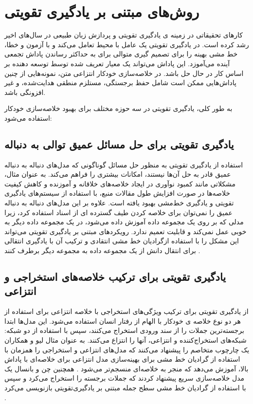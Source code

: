\chapter{روش‌های مبتنی بر یادگیری تقویتی}

کارهای تحقیقاتی در زمینه ی یادگیری تقویتی 
و پردازش زبان طبیعی در سال‌های اخیر رشد کرده است. در یادگیری تقویتی  یک عامل با محیط تعامل می‌کند و با آزمون و خطا، خط مشی بهینه را برای تصمیم گیری متوالی برای به حداکثر رساندن پاداش تجمعی آینده می‌آموزد. این پاداش می‌تواند یک معیار تعریف شده توسط توسعه دهنده بر اساس کار در حال حل باشد. در خلاصه‌سازی خودکار انتزاعی متن، نمونه‌هایی از چنین پاداش‌هایی ممکن است شامل حفظ برجستگی، مستلزم منطقی هدایت‌شده، و غیر افزونگی باشد. 

به طور کلی،  یادگیری تقویتی  در سه حوزه مختلف برای بهبود خلاصه‌سازی خودکار استفاده می‌شود:

\section{یادگیری تقویتی برای حل مسائل عمیق توالی به دنباله}

استفاده از یادگیری تقویتی به منظور حل مسائل گوناگونی که مدل‌های دنباله به دنباله عمیق قادر به حل آن‌ها نیستند، امکانات بیشتری را فراهم می‌کند. به عنوان مثال، مشکلاتی مانند کمبود نوآوری در ایجاد خلاصه‌های خلاقانه و آموزنده و کاهش کیفیت خلاصه‌ها در صورت افزایش طول مقالات منبع، با استفاده از سیستم‌های یادگیری تقویتی و یادگیری خط‌مشی		 بهبود یافته است.
 علاوه بر این  مدل‌های دنباله به دنباله عمیق را نمی‌توان برای خلاصه کردن طیف گسترده ای از اسناد استفاده کرد، زیرا مدلی که بر روی یک مجموعه داده آموزش داده می‌شود، در یک مجموعه داده دیگر به خوبی عمل نمی‌کند و قابلیت تعمیم ندارد. رویکردهای مبتنی بر یادگیری تقویتی می‌تواند این  مشکل را با استفاده ازگرادیان خط مشی انتقادی
  و ترکیب آن با یادگیری انتقالی
برای انتقال دانش از یک مجموعه داده به مجموعه دیگر برطرف کنند
\cite{DeepTL_RL}.


\section{یادگیری تقویتی برای ترکیب خلاصه‌های استخراجی و انتزاعی} 
  از یادگیری تقویتی برای ترکیب ویژگی‌های استخراجی با خلاصه انتزاعی برای استفاده از هر دو نوع خلاصه ی خودکار با الهام از رفتار انسان استفاده می‌شود. این مدل‌ها ابتدا برجسته‌ترین جملات را از سند ورودی استخراج می‌کنند، سپس با استفاده از دو شبکه: شبکه‌های استخراج‌کننده و انتزاعی، آنها را انتزاع می‌کنند. به عنوان مثال لیو و همکاران یک چارچوب متخاصم را پیشنهاد می‌کنند که مدل‌های انتزاعی و استخراجی را همزمان با استفاده از گرادیان خط ‌مشی برای بهینه‌سازی مدل انتزاعی برای خلاصه‌ای با پاداش بالا، آموزش می‌دهد که منجر به خلاصه‌ای منسجم‌تر می‌شود
  \cite{ALOMARI}.
  همچنین چن و بانسال یک مدل خلاصه‌سازی سریع پیشنهاد کردند که جملات برجسته را استخراج می‌کرد و سپس با استفاده از گرادیان خط مشی سطح جمله مبتنی بر یادگیری‌تقویتی بازنویسی می‌کرد
  \cite{chen2018fast}.


